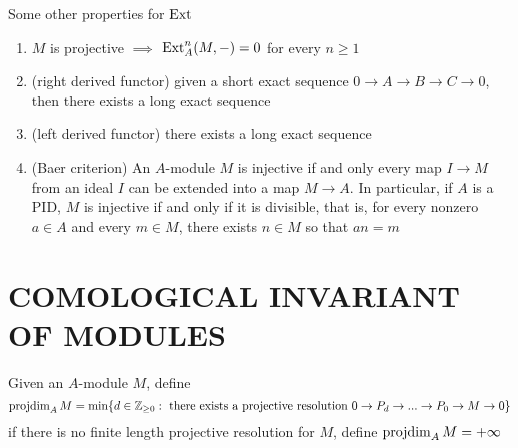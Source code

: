 \begin{proposition}
	Some other properties for $\operatorname{Ext}$
	\begin{enumerate}
		\item $M$ is projective $\implies$ $\operatorname{Ext}^n_A(M, -) = 0$ for every $n \geq 1$
		\item (right derived functor) given a short exact sequence $0 \to A \to B \to C \to 0$, then there exists a long exact sequence
		\begin{center}
		\end{center}
		\item (left derived functor) there exists a long exact sequence
		\begin{center}
		\end{center}
		
		\item (Baer criterion)
		An $A$-module $M$ is injective if and only every map $I \to M$ from an ideal $I$ can be extended into a map $M \to A$. In particular, if $A$ is a PID, $M$ is injective if and only if it is divisible, that is, for every nonzero $a \in A$ and every $m \in M$, there exists $n \in M$ so that $an= m$
	\end{enumerate}
\end{proposition}

\section{COMOLOGICAL INVARIANT OF MODULES}

\begin{definition}
	Given an $A$-module $M$, define
	$$
		\operatorname{projdim}_A M = \min \{d \in \mathbb{Z}_{\geq 0}: \text{ there exists a projective resolution } 0 \to P_d \to ... \to P_0 \to M \to 0\}
	$$
	if there is no finite length projective resolution for $M$, define $\operatorname{projdim}_A M = +\infty$
\end{definition}

